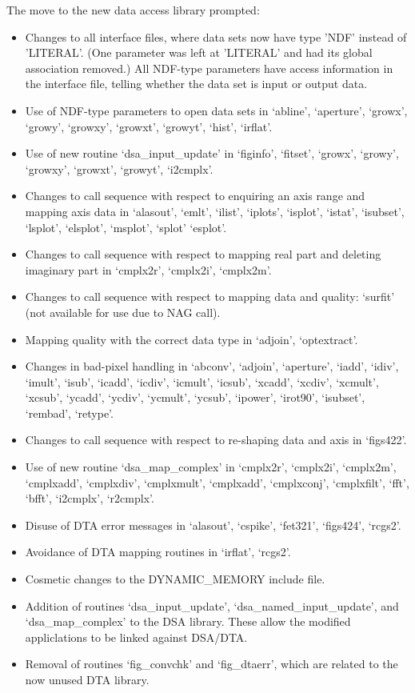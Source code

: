    The move to the new data access library prompted:

\begin{itemize}
\item Changes to all interface files, where data sets now have type 'NDF'
      instead of 'LITERAL'.  (One parameter was left at 'LITERAL' and had
      its global association removed.) All NDF-type parameters have access
      information in the interface file, telling whether the data set is
      input or output data.
\item Use of NDF-type parameters to open data sets in `abline', `aperture',
      `growx', `growy', `growxy', `growxt', `growyt', `hist', `irflat'.
\item Use of new routine `dsa\_input\_update' in `figinfo', `fitset',
      `growx', `growy', `growxy', `growxt', `growyt', `i2cmplx'.
\item Changes to call sequence with respect to enquiring an axis range and
      mapping axis data in `alasout', `emlt', `ilist', `iplots',
      `isplot', `istat', `isubset', `lsplot', `elsplot', `msplot',
      `splot' `esplot'.
\item Changes to call sequence with respect to mapping real part and
      deleting imaginary part in `cmplx2r', `cmplx2i', `cmplx2m'.
\item Changes to call sequence with respect to mapping data and quality:
      `surfit' (not available for use due to NAG call).
\item Mapping quality with the correct data type in `adjoin', `optextract'.
\item Changes in bad-pixel handling in `abconv', `adjoin', `aperture',
      `iadd', `idiv', `imult', `isub', `icadd', `icdiv', `icmult',
      `icsub', `xcadd', `xcdiv', `xcmult', `xcsub', `ycadd', `ycdiv',
      `ycmult', `ycsub', `ipower', `irot90', `isubset', `rembad', `retype'.
\item Changes to call sequence with respect to re-shaping data and axis in
      `figs422'.
\item Use of new routine `dsa\_map\_complex' in `cmplx2r', `cmplx2i',
      `cmplx2m', `cmplxadd', `cmplxdiv', `cmplxmult', `cmplxadd',
      `cmplxconj', `cmplxfilt', `fft', `bfft', `i2cmplx', `r2\-cmplx'.
\item Disuse of DTA error messages in `alasout', `cspike', `fet321', `figs424',
      `rcgs2'.
\item Avoidance of DTA mapping routines in `irflat', `rcgs2'.
\item Cosmetic changes to the DYNAMIC\_MEMORY include file.
\item Addition of routines `dsa\_input\_update',
      `dsa\_named\_input\_update', and `dsa\_map\_com\-plex' to the DSA
      library.  These allow the modified appliclations to be linked
      against DSA/DTA.
\item Removal of routines `fig\_convchk' and `fig\_dtaerr', which are
      related to the now unused DTA library.
\end{itemize}


